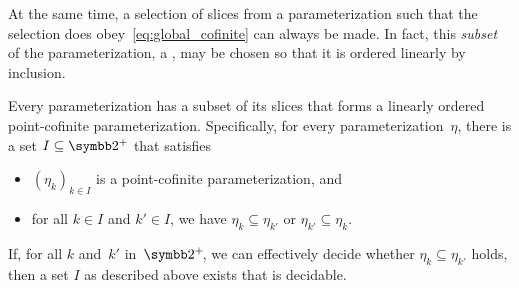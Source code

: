 At the same time, a selection of slices from a parameterization such that the selection does obey~\eqref{eq:global_cofinite} can always be made.
In fact, this \emph{subset} of the parameterization, a , may be chosen so that it is ordered linearly by inclusion.
\begin{lemma}
\label{lem:cofinal_chain}%
  Every parameterization has a subset of its slices that forms a linearly ordered point-cofinite parameterization.
  Specifically, for every parameterization~$\eta$, there is a set $I \subseteq \binary^+$ that satisfies
  \begin{itemize}
  \item $(\eta_k)_{k \in I}$ is a point-cofinite parameterization, and
  \item for all $k \in I$ and $k' \in I$, we have $\eta_k \subseteq \eta_{k'}$ or $\eta_{k'} \subseteq \eta_k$.
  \end{itemize}
  If, for all $k$ and~$k'$ in~$\binary^+\!$, we can effectively decide whether $\eta_k \subseteq \eta_{k'}$ holds, then a set $I$ as described above exists that is decidable.
\end{lemma}
